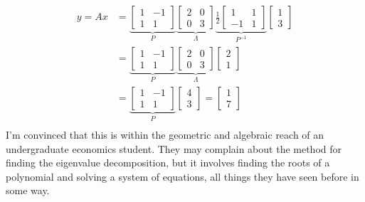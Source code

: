 \documentclass[10pt]{article}
\begin{document}
\begin{align*}
y = Ax &= \underbrace{\left[\begin{array}{cc} 1 & -1 \\ 1 & 1\end{array}\right]}_{P} \underbrace{\left[\begin{array}{cc} 2 & 0 \\ 0 & 3\end{array}\right]}_{\Lambda} \underbrace{\frac{1}{2} \left[\begin{array}{cc} 1 & 1 \\ -1 & 1\end{array}\right]}_{P^{-1}} \left[\begin{array}{c}
1 \\ 3
\end{array}\right] \\
&= \underbrace{\left[\begin{array}{cc} 1 & -1 \\ 1 & 1\end{array}\right]}_{P} \underbrace{\left[\begin{array}{cc} 2 & 0 \\ 0 & 3\end{array}\right]}_{\Lambda} \left[\begin{array}{c}
2 \\ 1
\end{array}\right]\\
&= \underbrace{\left[\begin{array}{cc} 1 & -1 \\ 1 & 1\end{array}\right]}_{P}  \left[\begin{array}{c}
4 \\ 3
\end{array}\right] = \left[\begin{array}{c}
1 \\ 7
\end{array}\right]\\
\end{align*}
I'm convinced that this is within the geometric and algebraic reach of an undergraduate economics student. They may complain about the method for finding the eigenvalue decomposition, but it involves finding the roots of a polynomial and solving a system of equations, all things they have seen before in some way.
\end{document}
